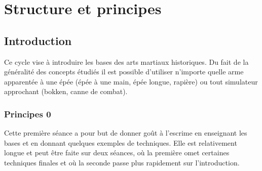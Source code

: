 \section{Structure et principes}


\subsection{Introduction}


Ce cycle vise à introduire les bases des arts martiaux historiques.
Du fait de la généralité des concepts étudiés il est possible d'utiliser n'importe quelle arme apparentée à une épée (épée à une main, épée longue, rapière) ou tout simulateur approchant (bokken, canne de combat).

\newpage
\subsubsection{Principes 0}


Cette première séance a pour but de donner goût à l'escrime en enseignant les bases et en donnant quelques exemples de techniques.
Elle est relativement longue et peut être faite sur deux séances, où la première omet certaines techniques finales et où la seconde passe plus rapidement sur l'introduction.


